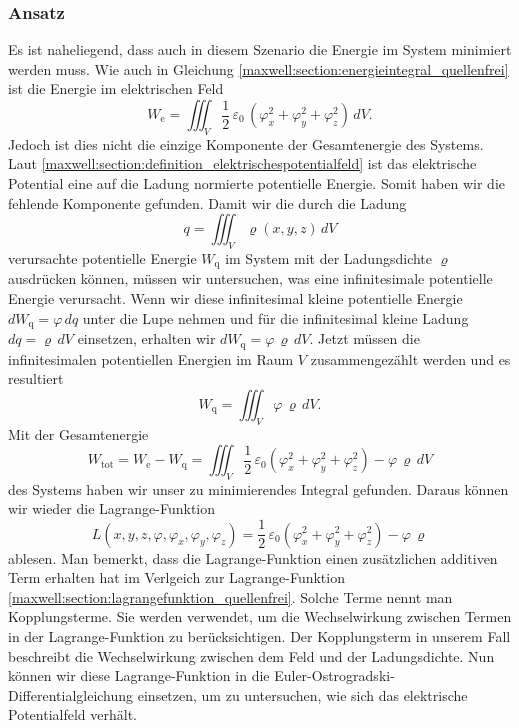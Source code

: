 \subsubsection{Ansatz}
Es ist naheliegend, dass auch in diesem Szenario die Energie im System minimiert werden muss.
Wie auch in Gleichung \eqref{maxwell:section:energieintegral_quellenfrei} ist die Energie im elektrischen Feld
\[
W_{\text{e}}
=
\iiint_V \frac{1}{2}\,\varepsilon_0\,(\varphi_x^2 + \varphi_y^2 + \varphi_z^2)\, dV.
\]
Jedoch ist dies nicht die einzige Komponente der Gesamtenergie des Systems.
Laut \eqref{maxwell:section:definition_elektrischespotentialfeld} ist das elektrische Potential eine auf die Ladung normierte potentielle Energie.
Somit haben wir die fehlende Komponente gefunden.
Damit wir die durch die Ladung
\begin{equation}
q
=
\iiint_V \varrho(x,y,z)\, dV
\label{maxwell:ladung}
\end{equation}
verursachte potentielle Energie $W_{\text{q}}$ im System mit der Ladungsdichte $\varrho$ ausdrücken können, müssen wir untersuchen, was eine infinitesimale potentielle Energie verursacht.
Wenn wir diese infinitesimal kleine potentielle Energie
\(
dW_{\text{q}}
=
\varphi\, dq
\)
unter die Lupe nehmen und für die infinitesimal kleine Ladung
\(
dq
=
\varrho\, dV
\)
einsetzen, erhalten wir
\(
dW_{\text{q}}
=
\varphi\,\varrho\, dV.
\)
Jetzt müssen die infinitesimalen potentiellen Energien im Raum $V$ zusammengezählt werden und es resultiert
\begin{equation}
W_{\text{q}}
=
\iiint_V \varphi\,\varrho\, dV.
\label{maxwell:section:potenzielle_energie_ladung}
\end{equation}
Mit der Gesamtenergie
\[
W_{\text{tot}}
=
W_{\text{e}} - W_{\text{q}}
=
\iiint_V \frac{1}{2}\,\varepsilon_0\left(\varphi_x^2 + \varphi_y^2 + \varphi_z^2\right) - \varphi\,\varrho\, dV
\]
des Systems haben wir unser zu minimierendes Integral gefunden.
Daraus können wir wieder die Lagrange-Funktion
\begin{equation}
L(x,y,z,\varphi,\varphi_x,\varphi_y,\varphi_z)
=
\frac{1}{2}\,\varepsilon_0\left(\varphi_x^2 + \varphi_y^2 + \varphi_z^2\right) - \varphi\,\varrho
\label{maxwell:section:lagrangefunktion_mit_quelle}
\end{equation}
ablesen.
Man bemerkt, dass die Lagrange-Funktion einen zusätzlichen additiven Term erhalten hat im Verlgeich zur Lagrange-Funktion \eqref{maxwell:section:lagrangefunktion_quellenfrei}.
Solche Terme nennt man Kopplungsterme.
Sie werden verwendet, um die Wechselwirkung zwischen Termen in der La\-gran\-ge-Funktion zu berücksichtigen.
Der Kopplungsterm in unserem Fall beschreibt die Wechselwirkung zwischen dem Feld und der Ladungsdichte.
Nun können wir diese Lagrange-Funktion in die Euler-Ostrogradski-Differentialgleichung einsetzen, um zu untersuchen, wie sich das elektrische Potentialfeld verhält.

